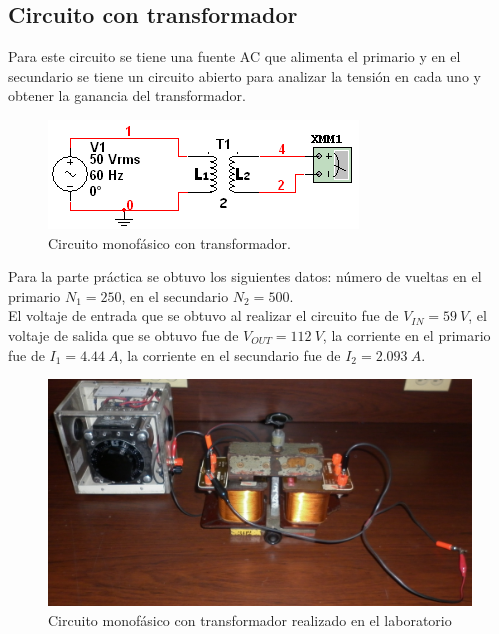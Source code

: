 \documentclass[twocolumn]{IEEEtran}
\begin{document}
\subsection{Circuito con transformador}
\noindent
Para este circuito se tiene una fuente AC que alimenta el primario y en el secundario se tiene un circuito abierto para analizar la tensión en cada uno y obtener la ganancia del transformador.
\begin{figure}[H]
	\centering
		\includegraphics[scale=0.7]{circ1.PNG}
	\caption{Circuito monofásico con transformador.}
	\label{fig10}
\end{figure}
\noindent
Para la parte práctica se obtuvo los siguientes datos: número de vueltas en el primario $N_1= 250$, en el secundario $N_2 = 500$.\\
El voltaje de entrada que se obtuvo al realizar el circuito fue de $V_{IN} = 59\ V$, el voltaje de salida que se obtuvo fue de $V_{OUT} = 112\ V$, la corriente en el primario fue de $I_1 = 4.44\ A$, la corriente en el secundario fue de $I_2 = 2.093\ A$.
\begin{figure}[H]
	\centering
		\includegraphics[scale=0.12]{436.png}
	\caption{Circuito monofásico con transformador realizado en el laboratorio}
	\label{fig20}
\end{figure}
\end{document}
